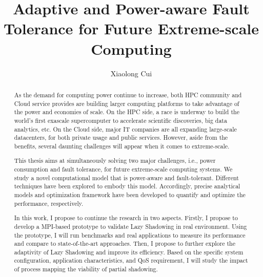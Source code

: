 \documentclass[driverfallback=dvipdfmx,final]{pittetd}
\title[Adaptive and Power-aware Fault Tolerance for Future Extreme-scale Computing]
{Adaptive and Power-aware Fault Tolerance for Future Extreme-scale Computing}
\author{Xiaolong Cui}
\begin{document}
\maketitle
%
\makecommittee
\copyrightpage                     %
\begin{abstract}
As the demand for computing power continue to increase, both HPC community and Cloud service provides are building larger computing platforms to take advantage of the power and economies of scale. On the HPC side, %
a race is underway to build the world's first exascale supercomputer 
to accelerate scientific discoveries, big data analytics, etc. On the Cloud side, major IT companies are all expanding large-scale datacenters, for both private usage and public services. However, aside from the benefits, several daunting challenges will appear when it comes to extreme-scale.

This thesis aims at simultaneously solving two major challenges, i.e., power consumption and fault tolerance, for future extreme-scale computing systems. We study a novel computational model that is power-aware and fault-tolerant. Different techniques have been explored to embody this model. Accordingly, precise analytical models and optimization framework have been developed to quantify and optimize the performance, respectively. 

In this work, I propose to continue the research in two aspects. Firstly, I propose to develop a MPI-based prototype to validate Lazy Shadowing in real environment. Using the prototype, I will run benchmarks and real applications to measure its performance and compare to state-of-the-art approaches. Then, I propose to further explore the adaptivity of Lazy Shadowing and improve its efficiency. Based on the specific system configuration, application characteristics, and QoS requirement, I will study 
the impact of process mapping the viability of partial shadowing.     

\end{abstract}
\end{document}
